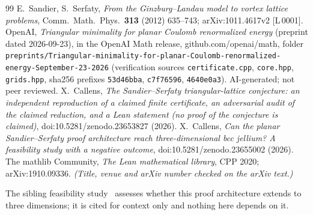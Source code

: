 \documentclass[10pt]{article}
\newcommand{\tg}[2]{\texorpdfstring{\textsf{[#1\,#2]}}{}}  %
\renewcommand{\_}{\textunderscore\allowbreak}
\begin{document}
\begin{thebibliography}{99}\small
{} E.~Sandier, S.~Serfaty, \emph{From the Ginzburg--Landau model to vortex lattice problems}, Comm.\ Math.\ Phys.\ \textbf{313} (2012) 635--743; arXiv:1011.4617v2 \tg{L}{0001}.
 OpenAI, \emph{Triangular minimality for planar Coulomb renormalized energy} (preprint dated 2026-09-23), in the OpenAI Math release, github.com/openai/math, folder \texttt{preprints/Triangular-minimality-for-planar-Coulomb-renormalized-energy-September-23-2026} (verification sources \texttt{certificate.cpp}, \texttt{core.hpp}, \texttt{grids.hpp}, sha256 prefixes \texttt{53d46bba}, \texttt{c7f76596}, \texttt{4640e0a3}). AI-generated; not peer reviewed.
 X.~Callens, \emph{The Sandier--Serfaty triangular-lattice conjecture: an independent reproduction of a claimed finite certificate, an adversarial audit of the claimed reduction, and a Lean statement (no proof of the conjecture is claimed)}, doi:10.5281/zenodo.23653827 (2026).
 X.~Callens, \emph{Can the planar Sandier--Serfaty proof architecture reach three-dimensional bcc jellium? A feasibility study with a negative outcome}, doi:10.5281/zenodo.23655002 (2026).
 The mathlib Community, \emph{The Lean mathematical library}, CPP 2020; arXiv:1910.09336. \emph{(Title, venue and arXiv number checked on the arXiv text.)}
\end{thebibliography}
\noindent The sibling feasibility study~\cite{p3d} assesses whether this proof architecture extends to three dimensions; it is cited for context only and nothing here depends on it.
\end{document}
